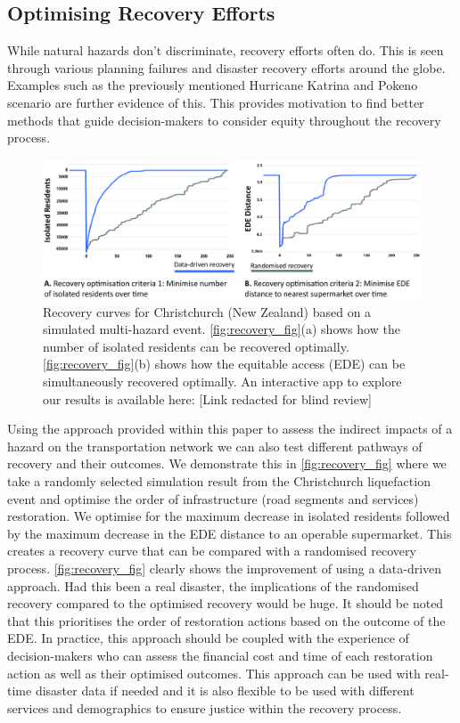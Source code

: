 \documentclass[review,3p,times,onecolumn,sort&compress,12pt]{elsarticle}
\begin{document}
\subsection{Optimising Recovery Efforts}
While natural hazards don't discriminate, recovery efforts often do.
This is seen through various planning failures and disaster recovery efforts around the globe.
Examples such as the previously mentioned Hurricane Katrina and Pokeno scenario are further evidence of this.
This provides motivation to find better methods that guide decision-makers to consider equity throughout the recovery process.

\begin{figure}[b!]
    \includegraphics[width=0.95\linewidth]{report/fig/recovery_fig.jpg}
    \caption{Recovery curves for Christchurch (New Zealand) based on a simulated multi-hazard event. \autoref{fig:recovery_fig}(a) shows how the number of isolated residents can be recovered optimally. \autoref{fig:recovery_fig}(b) shows how the equitable access (EDE) can be simultaneously recovered optimally.  An interactive app to explore our results is available here: [Link redacted for blind review]}
    \label{fig:recovery_fig}
\end{figure}

Using the approach provided within this paper to assess the indirect impacts of a hazard on the transportation network we can also test different pathways of recovery and their outcomes.
We demonstrate this in \autoref{fig:recovery_fig} where we take a randomly selected simulation result from the Christchurch liquefaction event and optimise the order of infrastructure (road segments and services) restoration.
We optimise for the maximum decrease in isolated residents followed by the maximum decrease in the EDE distance to an operable supermarket.
This creates a recovery curve that can be compared with a randomised recovery process.
\autoref{fig:recovery_fig} clearly shows the improvement of using a data-driven approach.
Had this been a real disaster, the implications of the randomised recovery compared to the optimised recovery would be huge.
It should be noted that this prioritises the order of restoration actions based on the outcome of the EDE.
In practice, this approach should be coupled with the experience of decision-makers who can assess the financial cost and time of each restoration action as well as their optimised outcomes.
This approach can be used with real-time disaster data if needed and it is also flexible to be used with different services and demographics to ensure justice within the recovery process.
\end{document}
